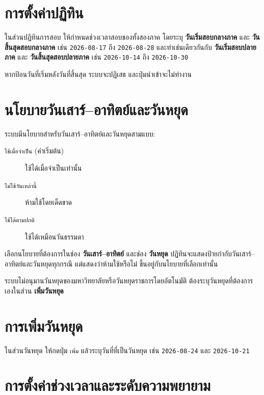 \section{การตั้งค่าปฏิทิน}

ในส่วนปฏิทินการสอบ ให้กำหนดช่วงเวลาสอบของทั้งสองภาค โดยระบุ
\textbf{วันเริ่มสอบกลางภาค} และ \textbf{วันสิ้นสุดสอบกลางภาค} เช่น
\texttt{2026-08-17} ถึง \texttt{2026-08-28} และทำเช่นเดียวกันกับ
\textbf{วันเริ่มสอบปลายภาค} และ \textbf{วันสิ้นสุดสอบปลายภาค} เช่น
\texttt{2026-10-14} ถึง \texttt{2026-10-30}

\begin{note}
หากป้อนวันที่เริ่มหลังวันที่สิ้นสุด ระบบจะปฏิเสธ และปุ่มนำเข้าจะไม่ทำงาน
\end{note}

\section{นโยบายวันเสาร์–อาทิตย์และวันหยุด}

ระบบมีนโยบายสำหรับวันเสาร์–อาทิตย์และวันหยุดสามแบบ:

\begin{description}
  \item[\texttt{ใช้เมื่อจำเป็น} (ค่าเริ่มต้น)] ใช้ได้เมื่อจำเป็นเท่านั้น
  \item[\texttt{ไม่ใช้วันเหล่านี้}] ห้ามใช้โดยเด็ดขาด
  \item[\texttt{ใช้ได้ตามปกติ}] ใช้ได้เหมือนวันธรรมดา
\end{description}

เลือกนโยบายที่ต้องการในช่อง \textbf{วันเสาร์–อาทิตย์} และช่อง \textbf{วันหยุด}
ปฏิทินจะแสดงป้ายกำกับวันเสาร์–อาทิตย์และวันหยุดทุกกรณี แต่แสดงว่าห้ามใช้หรือไม่
ขึ้นอยู่กับนโยบายที่เลือกเท่านั้น

\begin{note}
ระบบไม่อนุมานวันหยุดของมหาวิทยาลัยหรือวันหยุดราชการโดยอัตโนมัติ
ต้องระบุวันหยุดที่ต้องการเองในส่วน \textbf{เพิ่มวันหยุด}
\end{note}

\section{การเพิ่มวันหยุด}

ในส่วนวันหยุด ให้กดปุ่ม \texttt{เพิ่ม} แล้วระบุวันที่ที่เป็นวันหยุด
เช่น \texttt{2026-08-24} และ \texttt{2026-10-21}

\section{การตั้งค่าช่วงเวลาและระดับความพยายาม}

